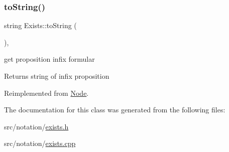 \mbox{\label{class_exists_a8eda64d4fd60158c15b38f64a4596068}} 
\subsubsection{\texorpdfstring{to\+String()}{toString()}}
{\footnotesize\ttfamily string Exists\+::to\+String (\begin{DoxyParamCaption}{ }\end{DoxyParamCaption})\hspace{0.3cm}{\ttfamily [override]}, {\ttfamily [virtual]}}



get proposition infix formular 

\begin{DoxyReturn}{Returns}
string of infix proposition 
\end{DoxyReturn}


Reimplemented from \hyperlink{class_node_a0746502074a232243dcac3b96f3ce2d0}{Node}.



The documentation for this class was generated from the following files\+:\begin{DoxyCompactItemize}
\item 
src/notation/\hyperlink{exists_8h}{exists.\+h}\item 
src/notation/\hyperlink{exists_8cpp}{exists.\+cpp}\end{DoxyCompactItemize}
